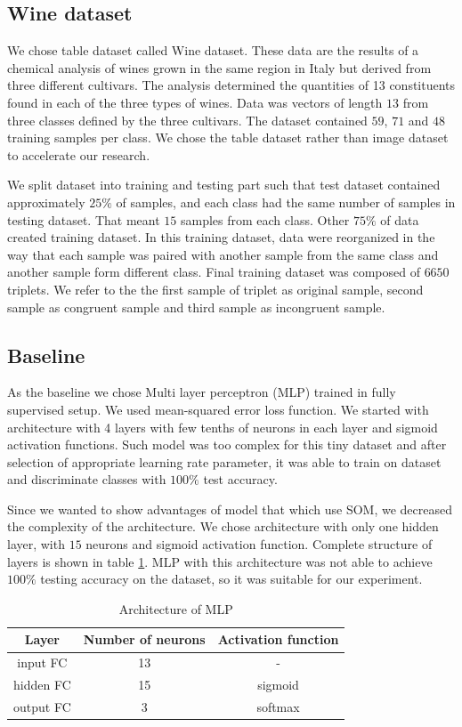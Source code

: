 \subsection{Wine dataset}
We chose table dataset called Wine dataset. These data are the results of a chemical analysis of wines grown in the same region in Italy but derived from three different cultivars. The analysis determined the quantities of 13 constituents found in each of the three types of wines. Data was vectors of length $13$ from three classes defined by the three cultivars. The dataset contained $59$, $71$ and $48$ training samples per class. \cite{misc_wine_109} 
We chose the table dataset rather than image dataset to accelerate our research.

We split dataset into training and testing part such that test dataset contained approximately $25\%$ of samples, and each class had the same number of samples in testing dataset. That meant $15$ samples from each class. Other $75\%$ of data created training dataset. In this training dataset, data were reorganized in the way that each sample was paired with another sample from the same class and another sample form different class. Final training dataset was composed of $6650$ triplets. We refer to the the first sample of triplet as original sample, second sample as congruent sample and third sample as incongruent sample.

\subsection{Baseline}
\label{sup-baseline}
As the baseline we chose Multi layer perceptron (MLP) trained in fully supervised setup. We used mean-squared error loss function. We started with architecture with 4 layers with few tenths of neurons in each layer and sigmoid activation functions. Such model was too complex for this tiny dataset and after selection of appropriate learning rate parameter, it was able to train on dataset and discriminate classes with $100\%$ test accuracy. 

Since we wanted to show advantages of model that which use SOM, we decreased the complexity of the architecture. We chose architecture with only one hidden layer, with $15$ neurons and sigmoid activation function. Complete structure of layers is shown in table \ref{mlp=layers}. MLP with this architecture was not able to achieve $100\%$ testing accuracy on the dataset, so it was suitable for our experiment.


\begin{table}[ht]
    \centering
    \begin{tabular}{ |c|c|c|} 
     \hline
            Layer & Number of neurons & Activation function\\
            \hline
            input FC & 13 &  - \\
            hidden FC & 15 & sigmoid  \\
            output FC  & 3 & softmax \\
     \hline
    \end{tabular}
    \caption{Architecture of MLP}
    \label{mlp=layers}
\end{table}

